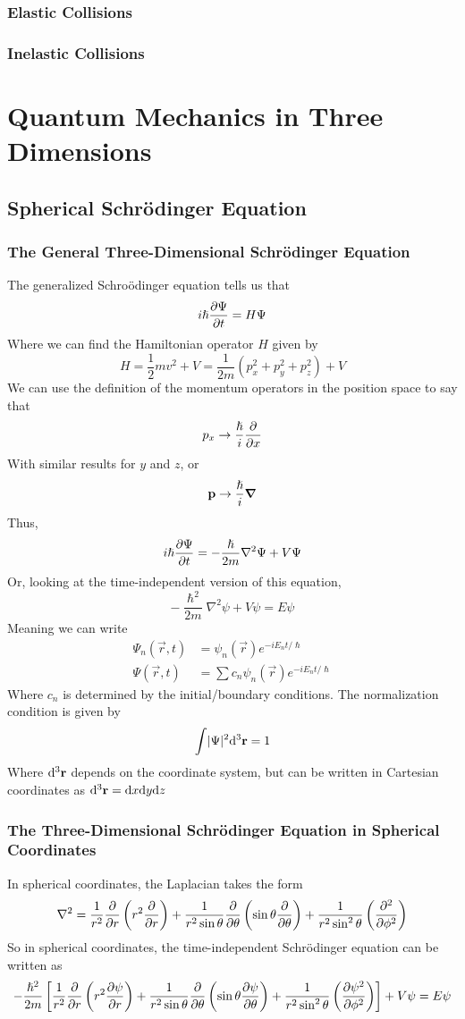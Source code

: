 \documentclass[a4paper]{article}
\begin{document}
\subsubsection{Elastic Collisions}


\subsubsection{Inelastic Collisions}

\section{Quantum Mechanics in Three Dimensions}
\subsection{Spherical Schr\"odinger Equation}
\subsubsection{The General Three-Dimensional Schr\"odinger Equation}
The generalized Schro\"odinger equation tells us that
\[ i\hslash\frac{\partial \Psi}{\partial t}=H\Psi \]
Where we can find the Hamiltonian operator $H$ given by
\[ H=\frac12 mv^2+V=\frac{1}{2m}(p_x^2+p_y^2+p_z^2)+V \]
We can use the definition of the momentum operators in the position space to
say that
\[ p_x \to \frac{\hslash}{i}\pd{x} \]
With similar results for $y$ and $z$, or
\[ \boldsymbol{\mathbf{p}} \to \frac{\hslash}{i}\boldsymbol{\mathbf{\nabla}} \]
Thus,
\[ i\hslash\frac{\partial \Psi}{\partial t}=-\frac{\hslash}{2m}\nabla^2\Psi+V\Psi \]
Or, looking at the time-independent version of this equation,
\[ -\frac{\hslash^2}{2m}\nabla^2\psi + V\psi = E\psi \]
Meaning we can write
\begin{align*}
	\Psi_n(\vec{r},t) &= \psi_n(\vec{r})e^{-iE_nt/\hslash}\\
	\Psi(\vec{r},t)&=\sum c_n\psi_n(\vec{r})e^{-iE_nt/\hslash}
\end{align*}
Where $c_n$ is determined by the initial/boundary conditions. The normalization
condition is given by
\[ \int\lvert\Psi\rvert^2\mathrm{d}^3\boldsymbol{\mathbf{r}} = 1 \]
Where $\mathrm{d}^3\boldsymbol{\mathbf{r}}$ depends on the coordinate system, but can be written in
Cartesian coordinates as $\mathrm{d}^3\boldsymbol{\mathbf{r}}=\mathrm{d} x\mathrm{d} y\mathrm{d} z$

\subsubsection{The Three-Dimensional Schr\"odinger Equation in Spherical
Coordinates}
In spherical coordinates, the Laplacian takes the form
\[ \nabla^2 = \frac{1}{r^2}\pd{r}\left(r^2\pd{r}\right) +\frac{1}
{r^2\sin\theta}\pd{\theta}\left(\sin\theta\pd{\theta}\right)+
\frac{1}{r^2\sin^2\theta} \left(\pder{^2}{\phi^2}\right)\]
So in spherical coordinates, the time-independent Schr\"odinger equation can
be written as
\[ -\frac{\hslash^2}{2m}\left[
\frac{1}{r^2}\pd{r}\left(r^2\pder{\psi}{r}\right) +\frac{1}
{r^2\sin\theta}\pd{\theta}\left(\sin\theta\pder{\psi}{\theta}\right)+
\frac{1}{r^2\sin^2\theta} \left(\pder{\psi^2}{\phi^2}\right)\right] + V\psi
= E\psi
\]
\end{document}
